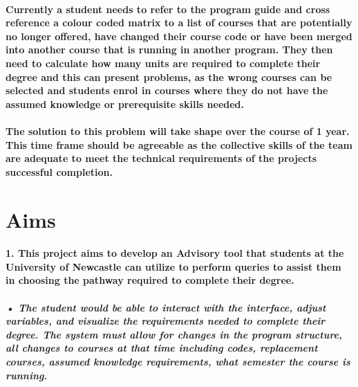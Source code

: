 \documentclass[12pt]{article}
\begin{document}
 \paragraph{ Currently a student needs to refer to the program guide and cross reference a colour coded matrix to a list of courses that are potentially no longer offered, have changed their course code or have been merged into another course that is running in another program. They then need to calculate how many units are required to complete their degree and this can present problems, as the wrong courses can be selected and students enrol in courses where they do not have the assumed knowledge or prerequisite skills needed.}
  
  \paragraph{The solution to this problem will take shape over the course of 1 year. This time frame should be agreeable as the collective skills of the team are adequate to meet the technical requirements of the projects successful completion.}




\section{Aims} %

\paragraph{1. This project aims to develop an Advisory tool that students at the University of Newcastle can utilize to perform queries to assist them in choosing the pathway required to complete their degree.} 

\subparagraph{•	The student would be able to interact with the interface, adjust variables, and visualize the requirements needed to complete their degree. The system must allow for changes in the program structure, all changes to courses at that time including codes, replacement courses, assumed knowledge requirements, what semester the course is running. }
\end{document}
